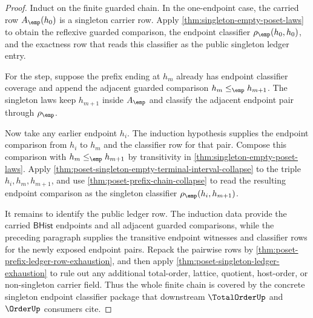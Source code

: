 \begin{proof}
Induct on the finite guarded chain. In the one-endpoint case, the carried row
$A_{\emp}(h_0)$ is a singleton carrier row. Apply
\autoref{thm:singleton-empty-poset-laws} to obtain the reflexive guarded
comparison, the endpoint classifier $\rho_{\emp}(h_0,h_0)$, and the exactness
row that reads this classifier as the public singleton ledger entry.

For the step, suppose the prefix ending at $h_m$ already has endpoint
classifier coverage and append the adjacent guarded comparison
$h_m\le_{\emp}h_{m+1}$. The singleton laws keep $h_{m+1}$ inside $A_{\emp}$ and
classify the adjacent endpoint pair through $\rho_{\emp}$.

Now take any earlier endpoint $h_i$. The induction hypothesis supplies the
endpoint comparison from $h_i$ to $h_m$ and the classifier row for that pair.
Compose this comparison with $h_m\le_{\emp}h_{m+1}$ by transitivity in
\autoref{thm:singleton-empty-poset-laws}. Apply
\autoref{thm:poset-singleton-empty-terminal-interval-collapse} to the triple
$h_i,h_m,h_{m+1}$, and use
\autoref{thm:poset-prefix-chain-collapse} to read the resulting endpoint
comparison as the singleton classifier $\rho_{\emp}(h_i,h_{m+1})$.

It remains to identify the public ledger row. The induction data provide the
carried $\mathsf{BHist}$ endpoints and all adjacent guarded comparisons, while
the preceding paragraph supplies the transitive endpoint witnesses and
classifier rows for the newly exposed endpoint pairs. Repack the pairwise rows
by \autoref{thm:poset-prefix-ledger-row-exhaustion}, and then apply
\autoref{thm:poset-singleton-ledger-exhaustion} to rule out any additional
total-order, lattice, quotient, host-order, or non-singleton carrier field.
Thus the whole finite chain is covered by the concrete singleton endpoint
classifier package that downstream $\TotalOrderUp$ and $\OrderUp$ consumers
cite.
\end{proof}

